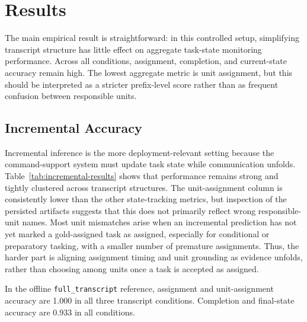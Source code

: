 \section{Results}
\label{sec:evaluation}

The main empirical result is straightforward: in this controlled setup, simplifying transcript structure has little effect on aggregate task-state monitoring performance. Across all conditions, assignment, completion, and current-state accuracy remain high. The lowest aggregate metric is unit assignment, but this should be interpreted as a stricter prefix-level score rather than as frequent confusion between responsible units.

\subsection{Incremental Accuracy}

Incremental inference is the more deployment-relevant setting because the command-support system must update task state while communication unfolds. Table~\ref{tab:incremental-results} shows that performance remains strong and tightly clustered across transcript structures. The unit-assignment column is consistently lower than the other state-tracking metrics, but inspection of the persisted artifacts suggests that this does not primarily reflect wrong responsible-unit names. Most unit mismatches arise when an incremental prediction has not yet marked a gold-assigned task as assigned, especially for conditional or preparatory tasking, with a smaller number of premature assignments. Thus, the harder part is aligning assignment timing and unit grounding as evidence unfolds, rather than choosing among units once a task is accepted as assigned.

In the offline \texttt{full\_transcript} reference, assignment and unit-assignment accuracy are 1.000 in all three transcript conditions. Completion and final-state accuracy are 0.933 in all conditions.

\begin{table}[t]
\centering
\small
{}
\caption{Incremental monitoring accuracy by transcript structure.}
\label{tab:incremental-results}
\end{table}

